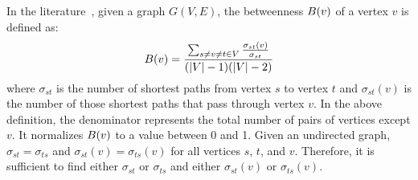 In the literature~\cite{centrality, everett, Brandes01afaster}, given a graph $G(V, E)$, the betweenness $B({v})$ of a vertex $v$ is defined as:
\begin{equation}\label{bet}
B({v}) = \frac{\sum_{s \neq v \neq t \in V}\frac{\sigma_{st}(v)}{\sigma_{st}}}{(|V|-1)(|V|-2)}
\end{equation} where $\sigma_{st}$ is the number of shortest paths from vertex $s$ to vertex $t$ and $\sigma_{st}(v)$ is the number of those shortest paths that pass through vertex $v$. 
In the above definition, the denominator represents the total number of pairs of vertices except $v$.
It normalizes $B({v})$ to a value between 0 and 1.
Given an undirected graph, $\sigma_{st}=\sigma_{ts}$ and $\sigma_{st}(v)=\sigma_{ts}(v)$ for all vertices $s$, $t$, and $v$.
Therefore, it is sufficient to find either $\sigma_{st}$ or $\sigma_{ts}$ and either $\sigma_{st}(v)$ or $\sigma_{ts}(v)$.
% 

